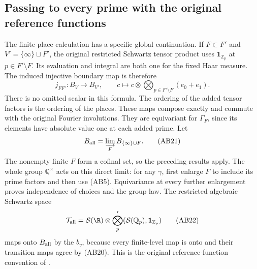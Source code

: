 \documentclass[11pt,a4paper]{article}
\theoremstyle{definition}\newtheorem{definition}[theorem]{Definition}
\newcommand{\Z}{\mathbb Z}\newcommand{\Q}{\mathbb Q}
\newcommand{\Sch}{\mathcal S}\newcommand{\im}{\operatorname{im}}
\begin{document}
\subsection{Passing to every prime with the original reference functions}
The finite-place calculation has a specific global continuation. If
$F\subset F'$ and $V'=\{\infty\}\sqcup F'$, the original restricted
Schwartz tensor product uses $\mathbf1_{\Z_p}$ at $p\in F'\setminus F$.
Its evaluation and integral are both one for the fixed Haar measure.
The induced injective boundary map is therefore
\[
 j_{FF'}:B_V\longrightarrow B_{V'},\qquad
 c\longmapsto c\otimes\bigotimes_{p\in F'\setminus F}(e_0+e_1).
 \tag{AB20}
\]
There is no omitted scalar in this formula. The ordering of the added
tensor factors is the ordering of the places. These maps compose exactly
and commute with the original Fourier involutions. They are equivariant
for $\Gamma_F$, since its elements have absolute value one at each added
prime. Let
\[
 B_{\rm all}=\varinjlim_F B_{\{\infty\}\cup F}.
 \tag{AB21}
\]
The nonempty finite $F$ form a cofinal set, so the preceding results apply.
The whole group $\Q^\times$ acts on this direct limit: for any $\gamma$,
first enlarge $F$ to include its prime factors and then use (AB5).
Equivariance at every further enlargement proves independence of choices
and the group law. The restricted algebraic Schwartz space
\[
 \mathcal T_{\rm all}=\Sch(\R)\otimes
              \bigotimes_{p}'(\Sch(\Q_p),\mathbf1_{\Z_p})
 \tag{AB22}
\]
maps onto $B_{\rm all}$ by the $b_v$, because every finite-level map is
onto and their transition maps agree by (AB20). This is the original
reference-function convention of \cite[Section III]{Connes1998}.
\end{document}
